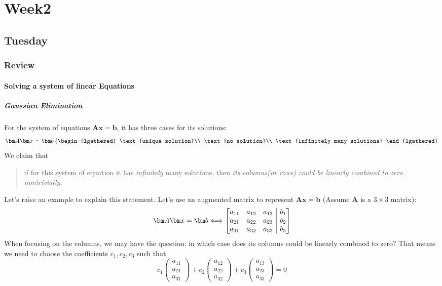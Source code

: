 
\chapter{Week2}
\section{Tuesday}
\subsection{Review}
\subsubsection{Solving a system of linear Equations}
\paragraph{Gaussian Elimination}
For the system of equations $\bm A\bm x = \bm b$, it has three cases for its solutions:
\[
\bm A\bm x = \bm b\left\{
\begin{lgathered}
\text{unique solution}\\
\text{no solution}\\
\text{infinitely many solutions}
\end{lgathered}
\right.
\]
We claim that 
\begin{quotation}
if for this system of equation it has \emph{infinitely} many solutions, then \textit{its columns(or rows) could be linearly combined to zero nontrivially.} 
\end{quotation}
Let's raise an example to explain this statement. Let's use an augmented matrix to represent $\bm A\bm x = \bm b$ (Assume $\bm A$ is a $3\times 3$ matrix):
\[
\bm A\bm x = \bm b\Longleftrightarrow 
\left[
\begin{array}{@{}ccc|c@{}}
a_{11}&a_{12}&a_{13}&b_1\\
a_{21}&a_{22}&a_{23}&b_2\\
a_{31}&a_{32}&a_{33}&b_3
\end{array}
\right]
\]
When focusing on the columns, we may have the question: in which case does its columns could be linearly combined to zero? That means we need to choose the coefficients $c_1,c_2,c_3$ such that 
\[
c_1\begin{pmatrix}
a_{11}\\a_{21}\\a_{31}
\end{pmatrix}+c_2\begin{pmatrix}
a_{12}\\a_{22}\\a_{32}
\end{pmatrix}+c_3\begin{pmatrix}
a_{13}\\a_{23}\\a_{33}
\end{pmatrix} = 0
\]
